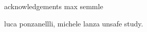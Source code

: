 \begin{acknowledgements}
acknowledgements
max semmle

luca ponzanellli, michele lanza unsafe study.
\end{acknowledgements}